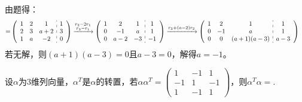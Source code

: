 \documentclass[a4paper]{report}
\begin{document}
\begin{jie}
由题得：
\begin{align*}
[A|B]=&
\left(
 \begin{array}{c:c}
\begin{matrix}
1 & 2 & 1\\
2 & 3 & a+2 \\
1 & a & -2
\end{matrix}&
\begin{matrix}
1  \\
3 \\
0
\end{matrix}
\end{array}
\right)\xrightarrow{\substack{r_{2}-2r_{1}\\ r_{3}-r_{1}}}
{
\left(
 \begin{array}{c:c}
\begin{matrix}
1 & 2 & 1\\
0 & -1 & a \\
0 & a-2 & -3
\end{matrix}&
\begin{matrix}
1  \\
1\\
-1
\end{matrix}
\end{array}
\right)
}\xrightarrow{\substack{ r_{3}+(a-2)r_{2}}}
{
\left(
 \begin{array}{c:c}
\begin{matrix}
1 & 2 & 1\\
0 & -1 & a \\
0 & 0 & (a+1)(a-3)
\end{matrix}&
\begin{matrix}
1  \\
1\\
a-3
\end{matrix}
\end{array}
\right)
}
\end{align*}
若无解，则$(a+1)(a-3)=0$且$a-3=0$，解得$a=-1$。
\end{jie}

\EX 设$\alpha$为3维列向量，$\alpha^T$是$\alpha$的转置，若$\alpha\alpha^T=
\begin{pmatrix}
1&-1&1\\
-1&1&-1\\
1&-1&1
\end{pmatrix}
$，则$\alpha^T\alpha=$\underline{\hphantom{~~~~~~~~~~~~~}}.
\end{document}
